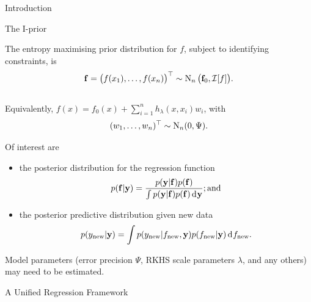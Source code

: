 \documentclass{beamer}
\newlength{\onecolwid}
\begin{document}
\begin{frame}[t]
\begin{columns}[t]
\begin{column}{\onecolwid}
\begin{block}{Introduction}
\begin{alertblock}{The I-prior}

The entropy maximising prior distribution for $f$, subject to identifying constraints, is 
~\\[-18pt]
\[
  {\mathbf f} = \big(f(x_1),\dots,f(x_n) \big)^\top \sim \operatorname{N}_n \big({\mathbf f}_0, {\mathcal I}[f] \big).
\]
~\\[-23pt]
Equivalently, $f(x) = f_0(x) + \sum_{i=1}^n h_\lambda(x,x_i)w_i$, with
~\\[-18pt]
\[
  (w_1, \dots, w_n)^\top \sim \operatorname{N}_n(0,\Psi).
\]
\vspace{-15pt}

\end{alertblock}

\vspace{-10pt}
Of interest are 

\newcommand{\new}{{\text{new}}}
\begin{itemize}
  \item the posterior distribution for the regression function
  \[
    p({\mathbf f}|{\mathbf y}) = \frac{p({\mathbf y}|{\mathbf f}) p({\mathbf f})}{\int p({\mathbf y}|{\mathbf f}) p({\mathbf f}) \operatorname{d\!\:\!} {\mathbf y}}; \text{and}
  \]
  \item the posterior predictive distribution given new data
  \[
    p(y_\new|\by) = \int p(y_\new|f_\new,\by) p(f_\new|\by) \d f_\new.
  \]
\end{itemize}
\vspace{5pt}
Model parameters (error precision $\Psi$, RKHS scale parameters $\lambda$, and any others) may need to be estimated.

\end{block}

\vspace{15pt}
\begin{block}{A Unified Regression Framework}


\end{block}
\end{column}
\end{columns}
\end{frame}
\end{document}

